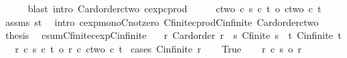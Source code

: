 \begin{isabellebody}
\ \ \ \ \isamarkupfalse%
\ {\isacharparenleft}{\kern0pt}blast\ intro{\isacharcolon}{\kern0pt}\ Card{\isacharunderscore}{\kern0pt}order{\isacharunderscore}{\kern0pt}ctwo\ cexp{\isacharunderscore}{\kern0pt}cprod{\isacharparenright}{\kern0pt}\isanewline
\ \ \isamarkupfalse%
\ \isamarkupfalse%
\ {\isachardoublequoteopen}ctwo\ {\isacharcircum}{\kern0pt}c\ {\isacharparenleft}{\kern0pt}s\ {\isacharasterisk}{\kern0pt}c\ t{\isacharparenright}{\kern0pt}\ {\isasymle}o\ ctwo\ {\isacharcircum}{\kern0pt}c\ t{\isachardoublequoteclose}\isanewline
\ \ \ \ \isamarkupfalse%
\ assms\ st\ \isamarkupfalse%
\ {\isacharparenleft}{\kern0pt}intro\ cexp{\isacharunderscore}{\kern0pt}mono{}{\isacharunderscore}{\kern0pt}Cnotzero\ Cfinite{\isacharunderscore}{\kern0pt}cprod{\isacharunderscore}{\kern0pt}Cinfinite\ Card{\isacharunderscore}{\kern0pt}order{\isacharunderscore}{\kern0pt}ctwo{\isacharparenright}{\kern0pt}\isanewline
\ \ \isamarkupfalse%
\ \isamarkupfalse%
\ {\isacharquery}{\kern0pt}thesis\ \isacommand{{\isachardot}{\kern0pt}}\isamarkupfalse%
\isanewline
{}\isamarkupfalse%
%
\endisatagproof
{\isafoldproof}%
%
\isadelimproof
\isanewline
%
\endisadelimproof
\isanewline
{}\isamarkupfalse%
\ csum{\isacharunderscore}{\kern0pt}Cfinite{\isacharunderscore}{\kern0pt}cexp{\isacharunderscore}{\kern0pt}Cinfinite{\isacharcolon}{\kern0pt}\isanewline
\ \ \ r{\isacharcolon}{\kern0pt}\ {\isachardoublequoteopen}Card{\isacharunderscore}{\kern0pt}order\ r{\isachardoublequoteclose}\ \ s{\isacharcolon}{\kern0pt}\ {\isachardoublequoteopen}Cfinite\ s{\isachardoublequoteclose}\ \ t{\isacharcolon}{\kern0pt}\ {\isachardoublequoteopen}Cinfinite\ t{\isachardoublequoteclose}\isanewline
\ \ \ {\isachardoublequoteopen}{\isacharparenleft}{\kern0pt}r\ {\isacharplus}{\kern0pt}c\ s{\isacharparenright}{\kern0pt}\ {\isacharcircum}{\kern0pt}c\ t\ {\isasymle}o\ {\isacharparenleft}{\kern0pt}r\ {\isacharplus}{\kern0pt}c\ ctwo{\isacharparenright}{\kern0pt}\ {\isacharcircum}{\kern0pt}c\ t{\isachardoublequoteclose}\isanewline
%
\isadelimproof
%
\endisadelimproof
%
\isatagproof
{}\isamarkupfalse%
\ {\isacharparenleft}{\kern0pt}cases\ {\isachardoublequoteopen}Cinfinite\ r{\isachardoublequoteclose}{\isacharparenright}{\kern0pt}\isanewline
\ \ \isamarkupfalse%
\ True\isanewline
\ \ \isamarkupfalse%
\ {\isachardoublequoteopen}r\ {\isacharplus}{\kern0pt}c\ s\ {\isacharequal}{\kern0pt}o\ r{\isachardoublequoteclose}\ \isamarkupfalse%

\end{isabellebody}
